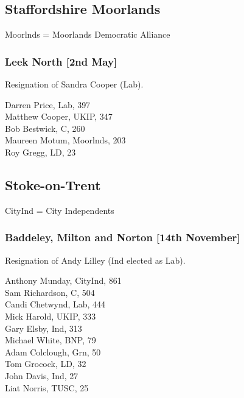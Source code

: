 \documentclass[a4paper,openany,10pt]{book}
\begin{document}
\subsection*{Staffordshire Moorlands}

Moorlnds = Moorlands Democratic Alliance

\subsubsection*{Leek North \hspace*{\fill}\nolinebreak[1]%
\enspace\hspace*{\fill}
[2nd May]}


Resignation of Sandra Cooper (Lab).



Darren Price, Lab, 397\\
Matthew Cooper, UKIP, 347\\
Bob Bestwick, C, 260\\
Maureen Motum, Moorlnds, 203\\
Roy Gregg, LD, 23\\


\subsection*{Stoke-on-Trent}

CityInd = City Independents

\subsubsection*{Baddeley, Milton and Norton \hspace*{\fill}\nolinebreak[1]%
\enspace\hspace*{\fill}
[14th November]}


Resignation of Andy Lilley (Ind elected as Lab).



Anthony Munday, CityInd, 861\\
Sam Richardson, C, 504\\
Candi Chetwynd, Lab, 444\\
Mick Harold, UKIP, 333\\
Gary Elsby, Ind, 313\\
Michael White, BNP, 79\\
Adam Colclough, Grn, 50\\
Tom Grocock, LD, 32\\
John Davis, Ind, 27\\
Liat Norris, TUSC, 25\\
\end{document}
